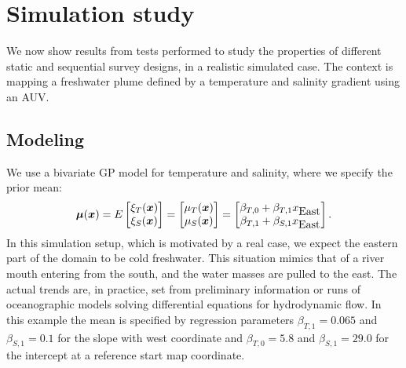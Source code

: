 \documentclass[aoas]{imsart}
\begin{document}
\section{Simulation study}
\label{sec:simulations}

We now show results from tests performed to study the properties of
different static and sequential survey designs, in a realistic
simulated case. The context is mapping a freshwater plume defined by a
temperature and salinity gradient using an AUV.

\subsection{Modeling}

We use a bivariate GP model for temperature and salinity, where we
specify the prior mean:
\begin{equation}\label{m}
    \bmu(\bx)=E 
    \begin{bmatrix}
    \xi_T(\bx) \\
    \xi_S(\bx) 
    \end{bmatrix}=\begin{bmatrix} \mu_{T}(\bx)\\
\mu_{S}(\bx)
\end{bmatrix} 
= \begin{bmatrix} \beta_{T,0} + \beta_{T,1} x_{\mbox{East}} \\
\beta_{T,1} + \beta_{S,1} x_{\mbox{East}}
\end{bmatrix}.
\end{equation}
In this simulation setup, which is motivated by a real case, we expect
the eastern part of the domain to be cold freshwater. This situation
mimics that of a river mouth entering from the south, and the water
masses are pulled to the east. The actual trends are, in practice, set
from preliminary information or runs of oceanographic models \cite{fossuminformation} solving differential equations for hydrodynamic flow. In this
example the mean is specified by regression parameters $\beta_{T,1}=0.065$ and
$\beta_{S,1}=0.1$ for the slope with west coordinate and $\beta_{T,0}=5.8$
and $\beta_{S,1}=29.0$ for the intercept at a reference start map coordinate.

\end{document}
